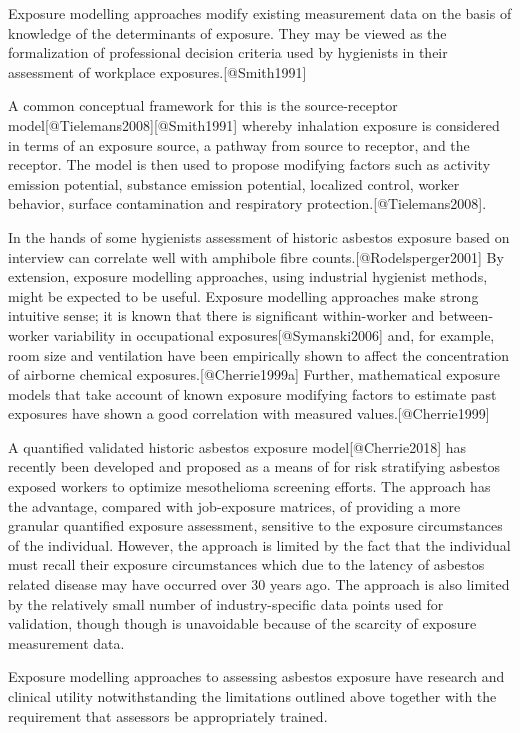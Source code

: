 \documentclass[
]{article}
\begin{document}
Exposure modelling approaches modify existing measurement data on the
basis of knowledge of the determinants of exposure. They may be viewed
as the formalization of professional decision criteria used by
hygienists in their assessment of workplace exposures.{[}@Smith1991{]}

A common conceptual framework for this is the source-receptor
model{[}@Tielemans2008{]}{[}@Smith1991{]} whereby inhalation exposure is
considered in terms of an exposure source, a pathway from source to
receptor, and the receptor. The model is then used to propose modifying
factors such as activity emission potential, substance emission
potential, localized control, worker behavior, surface contamination and
respiratory protection.{[}@Tielemans2008{]}.

In the hands of some hygienists assessment of historic asbestos exposure
based on interview can correlate well with amphibole fibre
counts.{[}@Rodelsperger2001{]} By extension, exposure modelling
approaches, using industrial hygienist methods, might be expected to be
useful. Exposure modelling approaches make strong intuitive sense; it is
known that there is significant within-worker and between-worker
variability in occupational exposures{[}@Symanski2006{]} and, for
example, room size and ventilation have been empirically shown to affect
the concentration of airborne chemical exposures.{[}@Cherrie1999a{]}
Further, mathematical exposure models that take account of known
exposure modifying factors to estimate past exposures have shown a good
correlation with measured values.{[}@Cherrie1999{]}

A quantified validated historic asbestos exposure
model{[}@Cherrie2018{]} has recently been developed and proposed as a
means of for risk stratifying asbestos exposed workers to optimize
mesothelioma screening efforts. The approach has the advantage, compared
with job-exposure matrices, of providing a more granular quantified
exposure assessment, sensitive to the exposure circumstances of the
individual. However, the approach is limited by the fact that the
individual must recall their exposure circumstances which due to the
latency of asbestos related disease may have occurred over 30 years ago.
The approach is also limited by the relatively small number of
industry-specific data points used for validation, though though is
unavoidable because of the scarcity of exposure measurement data.

Exposure modelling approaches to assessing asbestos exposure have
research and clinical utility notwithstanding the limitations outlined
above together with the requirement that assessors be appropriately
trained.
\end{document}

